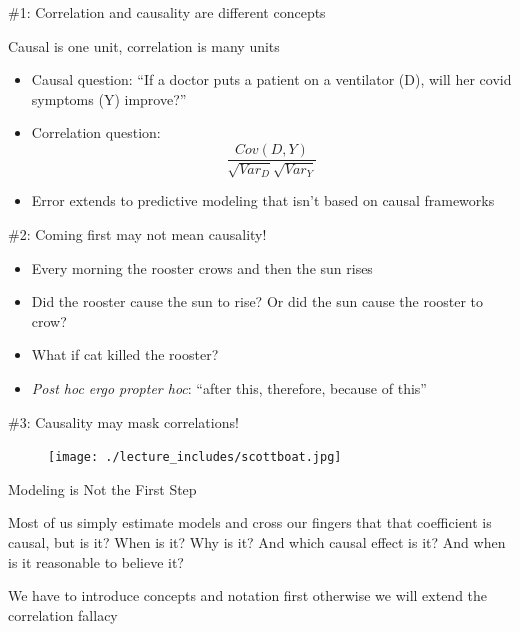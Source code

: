 \documentclass{beamer}
\begin{document}
\begin{frame}{\#1: Correlation and causality are different concepts}

  Causal is one unit, correlation is many units
  \begin{itemize}
    \item Causal question: ``If a doctor puts a patient on a ventilator (D), will her covid symptoms (Y) improve?''
    \item Correlation question:  $$\frac{Cov(D,Y)}{\sqrt{Var_D}\sqrt{{Var_Y}}}$$
    \item Error extends to predictive modeling that isn't based on causal frameworks
  \end{itemize}

\end{frame}



\begin{frame}{\#2: Coming first may not mean causality!}

  \begin{itemize}
    \item Every morning the rooster crows and then the sun rises
    \item Did the rooster cause the sun to rise? Or did the sun cause the rooster to crow?
    \item What if cat killed the rooster?
    \item \emph{Post hoc ergo propter hoc}: ``after this, therefore, because of this''
  \end{itemize}

\end{frame}

\begin{frame}{\#3: Causality may mask correlations!}

  \begin{figure}
    \centering
    \texttt{[image: ./lecture\_includes/scottboat.jpg]}
  \end{figure}

\end{frame}


\begin{frame}{Modeling is Not the First Step}

Most of us simply estimate models and cross our fingers that that coefficient is causal, but is it? When is it?  Why is it? And which causal effect is it?  And when is it reasonable to believe it? 

\bigskip

We have to introduce concepts and notation first otherwise we will extend the correlation fallacy


\end{frame}
\end{document}
